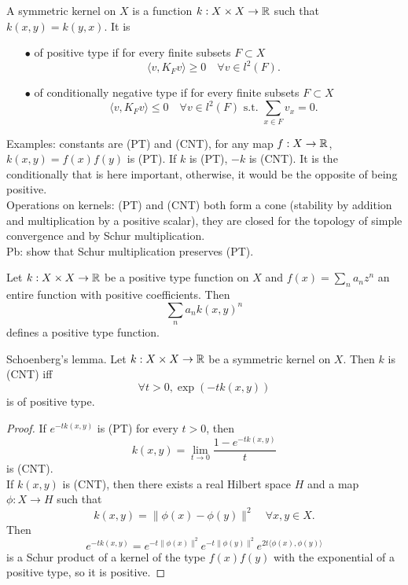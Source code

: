 A symmetric kernel on $X$ is a function $k: X\times X \rightarrow \mathbb R $ such that $k(x,y) = k(y,x)$. It is
\begin{itemize}
\item[$\bullet$] of positive type if for every finite subsets $F \subset X$
\[\langle v , K_F v \rangle \geq 0 \quad \forall v \in l^2(F).\] 
\item[$\bullet$] of conditionally negative type if for every finite subsets $F \subset X$
\[\langle v , K_F v \rangle \leq 0 \quad \forall v \in l^2(F)\text{ s.t. }\sum_{x\in F} v_x = 0.\] 
\end{itemize}

Examples: constants are (PT) and (CNT), for any map $f : X\rightarrow \mathbb R$, $k(x,y) =f(x)f(y)$ is (PT). If $k$ is (PT), $-k$ is (CNT). It is the conditionally that is here important, otherwise, it would be the opposite of being positive.\\

Operations on kernels: (PT) and (CNT) both form a cone (stability by addition and multiplication by a positive scalar), they are closed for the topology of simple convergence and by Schur multiplication. \\

Pb: show that Schur multiplication preserves (PT).\\

\begin{prop}
Let $k: X\times X\rightarrow \mathbb R $ be a positive type function on $X$ and $f(x)=\sum_n a_n z^n$ an entire function with positive coefficients. Then
\[\sum_n a_n k(x,y)^n\]
defines a positive type function. 
\end{prop}

\begin{thm} Schoenberg's lemma. Let $k: X\times X\rightarrow \mathbb R $ be a symmetric kernel on $X$. Then $k$ is (CNT) iff 
\[\forall t> 0 , \exp (-tk(x,y))\]
is of positive type.
\end{thm}

\begin{proof}
If $e^{-tk(x,y)}$ is (PT) for every $t>0$, then 
\[k(x,y) =\lim_{t\rightarrow 0} \frac{1-e^{-tk(x,y)}}{t}\]
is (CNT).\\

If $k(x,y)$ is (CNT), then there exists a real Hilbert space $H$ and a map $\phi: X \rightarrow H$ such that 
\[k(x,y) = \| \phi(x) - \phi(y) \|^2 \quad \forall x,y \in X.\]
Then
\[e^{-tk(x,y)} = e^{-t \| \phi(x) \|^2 } e^{-t \| \phi(y) \|^2 } e^{2t \langle \phi(x), \phi(y) \rangle } \]
is a Schur product of a kernel of the type $f(x)f(y)$ with the exponential of a positive type, so it is positive. 
\end{proof}

